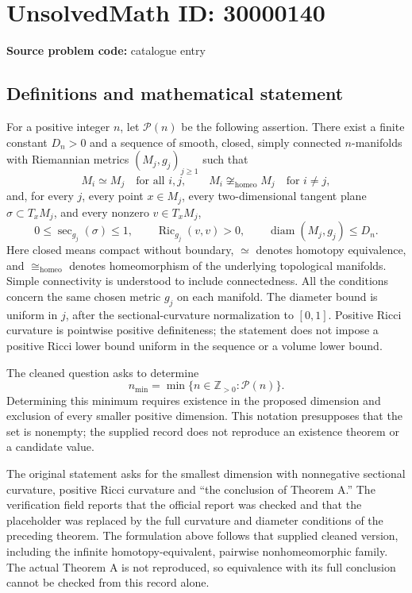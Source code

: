 \documentclass[11pt]{article}
\newcommand{\Z}{\mathbb{Z}}
\begin{document}
\section*{UnsolvedMath ID: 30000140}
\textbf{Source problem code:} catalogue entry
\subsection{Definitions and mathematical statement}
For a positive integer \(n\), let \(\mathcal P(n)\) be the following assertion. There exist a finite constant \(D_n>0\) and a sequence of smooth, closed, simply connected \(n\)-manifolds with Riemannian metrics \((M_j,g_j)_{j\geq1}\) such that
\[
 M_i\simeq M_j\quad\text{for all }i,j,\qquad
 M_i\not\cong_{\mathrm{homeo}}M_j\quad\text{for }i\ne j,
\]
and, for every \(j\), every point \(x\in M_j\), every two-dimensional tangent plane \(\sigma\subset T_xM_j\), and every nonzero \(v\in T_xM_j\),
\[
 0\leq\operatorname{sec}_{g_j}(\sigma)\leq1,
 \qquad \operatorname{Ric}_{g_j}(v,v)>0,
 \qquad \operatorname{diam}(M_j,g_j)\leq D_n.
\]
Here closed means compact without boundary, \(\simeq\) denotes homotopy equivalence, and \(\cong_{\mathrm{homeo}}\) denotes homeomorphism of the underlying topological manifolds. Simple connectivity is understood to include connectedness. All the conditions concern the same chosen metric \(g_j\) on each manifold. The diameter bound is uniform in \(j\), after the sectional-curvature normalization to \([0,1]\). Positive Ricci curvature is pointwise positive definiteness; the statement does not impose a positive Ricci lower bound uniform in the sequence or a volume lower bound.

The cleaned question asks to determine
\[
 n_{\min}=\min\{n\in\Z_{>0}:\mathcal P(n)\}.
\]
Determining this minimum requires existence in the proposed dimension and exclusion of every smaller positive dimension. This notation presupposes that the set is nonempty; the supplied record does not reproduce an existence theorem or a candidate value.

The original statement asks for the smallest dimension with nonnegative sectional curvature, positive Ricci curvature and ``the conclusion of Theorem A.'' The verification field reports that the official report was checked and that the placeholder was replaced by the full curvature and diameter conditions of the preceding theorem. The formulation above follows that supplied cleaned version, including the infinite homotopy-equivalent, pairwise nonhomeomorphic family. The actual Theorem A is not reproduced, so equivalence with its full conclusion cannot be checked from this record alone.
\end{document}
